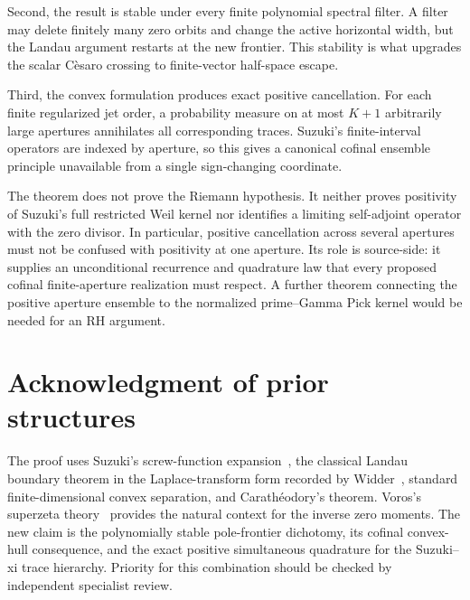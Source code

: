 \documentclass[11pt]{article}
\theoremstyle{remark}
\begin{document}
Second, the result is stable under every finite polynomial spectral filter.  A filter may delete
finitely many zero orbits and change the active horizontal width, but the Landau argument restarts
at the new frontier.  This stability is what upgrades the scalar C\`esaro crossing to finite-vector
half-space escape.

Third, the convex formulation produces exact positive cancellation.  For each finite regularized
jet order, a probability measure on at most $K+1$ arbitrarily large apertures annihilates all
corresponding traces.  Suzuki's finite-interval operators are indexed by aperture, so this gives a
canonical cofinal ensemble principle unavailable from a single sign-changing coordinate.

The theorem does not prove the Riemann hypothesis.  It neither proves positivity of Suzuki's full
restricted Weil kernel nor identifies a limiting self-adjoint operator with the zero divisor.  In
particular, positive cancellation across several apertures must not be confused with positivity at
one aperture.  Its role is source-side: it supplies an unconditional recurrence and quadrature law
that every proposed cofinal finite-aperture realization must respect.  A further theorem connecting
the positive aperture ensemble to the normalized prime--Gamma Pick kernel would be needed for an RH
argument.

\section*{Acknowledgment of prior structures}

The proof uses Suzuki's screw-function expansion~\cite{Suzuki2023}, the classical Landau boundary
theorem in the Laplace-transform form recorded by Widder~\cite{Widder1941}, standard finite-dimensional
convex separation, and Carath\'eodory's theorem.  Voros's superzeta theory~\cite{Voros2003,Voros2014}
provides the natural context for the inverse zero moments.  The new claim is the polynomially stable
pole-frontier dichotomy, its cofinal convex-hull consequence, and the exact positive simultaneous
quadrature for the Suzuki--xi trace hierarchy.  Priority for this combination should be checked by
independent specialist review.
\end{document}
